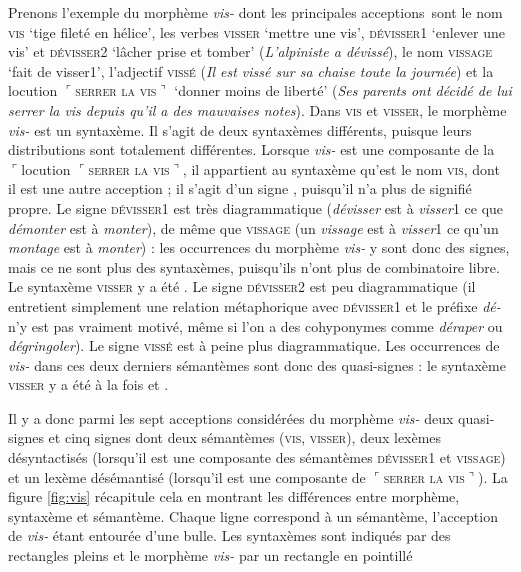 Prenons l’exemple du morphème \textit{vis-} dont les principales acceptions~sont le nom \textsc{vis} ‘tige fileté en hélice’, les verbes \textsc{visser} ‘mettre une vis’, \textsc{dévisser1} ‘enlever une vis’ et \textsc{dévisser2} ‘lâcher prise et tomber’ (\textit{L’alpiniste a dévissé}), le nom \textsc{vissage} ‘fait de visser1’, l’adjectif \textsc{vissé} (\textit{Il est vissé sur sa chaise toute la journée}) et la locution $⌜$\textsc{serrer} \textsc{la} \textsc{vis}$⌝$ ‘donner moins de liberté’ (\textit{Ses parents ont décidé de lui serrer la vis depuis qu’il a des mauvaises notes}). Dans \textsc{vis} et \textsc{visser}, le morphème \textit{vis-} est un syntaxème. Il s’agit de deux syntaxèmes différents, puisque leurs distributions sont totalement différentes. Lorsque \textit{vis-} est une composante de la $⌜$locution $⌜$\textsc{serrer} \textsc{la} \textsc{vis}$⌝$, il appartient au syntaxème qu’est le nom \textsc{vis}, dont il est une autre acception ; il s’agit d’un signe , puisqu’il n’a plus de signifié propre. Le signe \textsc{dévisser1} est très diagrammatique (\textit{dévisser} est à \textit{visser}1 ce que \textit{démonter} est à \textit{monter}), de même que \textsc{vissage} (un \textit{vissage} est à \textit{visser}1 ce qu’un \textit{montage} est à \textit{monter}) : les occurrences du morphème \textit{vis-} y sont donc des signes, mais ce ne sont plus des syntaxèmes, puisqu’ils n’ont plus de combinatoire libre. Le syntaxème \textsc{visser} y a été . Le signe \textsc{dévisser2} est peu diagrammatique (il entretient simplement une relation métaphorique avec \textsc{dévisser}1 et le préfixe \textit{dé-} n’y est pas vraiment motivé, même si l’on a des cohyponymes comme \textit{déraper} ou \textit{dégringoler}). Le signe \textsc{vissé} est à peine plus diagrammatique. Les occurrences de \textit{vis-} dans ces deux derniers sémantèmes sont donc des quasi-signes : le syntaxème \textsc{visser} y a été à la fois  et .

Il y a donc parmi les sept acceptions considérées du morphème \textit{vis-} deux quasi-signes et cinq signes dont deux sémantèmes (\textsc{vis,} \textsc{visser}), deux lexèmes désyntactisés (lorsqu’il est une composante des sémantèmes \textsc{dévisser1} et \textsc{vissage}) et un lexème désémantisé (lorsqu’il est une composante de $⌜$\textsc{serrer} \textsc{la} \textsc{vis}$⌝$).
La figure \ref{fig:vis}
récapitule cela en montrant les différences entre morphème, syntaxème et sémantème. Chaque ligne correspond à un sémantème, l’acception de \textit{vis-} étant entourée d’une bulle. Les syntaxèmes sont indiqués par des rectangles pleins et le morphème \textit{vis-} par un rectangle en pointillé


